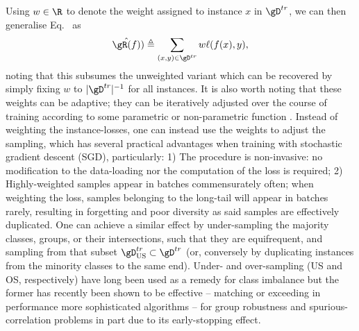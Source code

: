 %
Using \( w \in \R \) to denote the weight assigned to instance \(x\) in \( \gD^{tr} \), we can then
generalise Eq.~\cite{eq:emp_risk} as
%
\equ\begin{equation*} \label{eq:emp_risk_weighted}
  \hat{\gR(f)}) \triangleq \sum_{(x, y) \in \gD^{tr}} w \ell (f(x), y),
\end{equation*}
%
noting that this subsumes the unweighted variant which can be recovered by simply fixing \(w\) to
\( |\gD^{tr}|^{-1} \) for all instances.
%
It is also worth noting that these weights can be adaptive; they can be iteratively
adjusted over the course of training according to some parametric or non-parametric function
\citep{wang2021importance}.
%
Instead of weighting the instance-losses, one can instead use the weights to adjust the sampling,
which has several practical advantages when training with stochastic gradient descent (SGD),
particularly: 
%
1) The procedure is non-invasive: no modification to the data-loading nor the
computation of the loss is required;
%
2) Highly-weighted samples appear in batches commensurately often; when weighting the loss, samples
belonging to the long-tail will appear in batches rarely, resulting in forgetting and poor
diversity as said samples are effectively duplicated.
%
One can achieve a similar effect by under-sampling the majority classes, groups, or their
intersections, such that they are equifrequent, and \iid{} sampling from that subset \(
\gD^{tr}_{\text{US}} \subset \gD^{tr} \) (or, conversely by duplicating instances from the minority
classes to the same end).
%
Under- and over-sampling (US and OS, respectively) have long been used as a remedy for class imbalance
\citep{chawla2002smote} but the former has recently been shown to be effective -- matching or
exceeding in performance more sophisticated algorithms -- for group robustness and
spurious-correlation problems \citep{sagawa2020investigation, idrissi2022simple} in part due to its
early-stopping effect.

